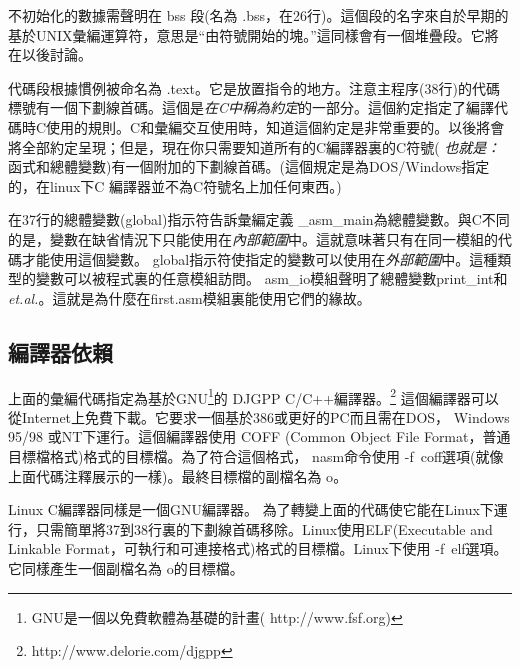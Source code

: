 不初始化的數據需聲明在 bss 段(名為{\code
.bss}，在26行)。這個段的名字來自於早期的基於UNIX彙編運算符，意思是``由符號開始的塊。''這同樣會有一個堆疊段。它將在以後討論。

代碼段根據慣例被命名為{\code
.text}。它是放置指令的地方。注意主程序(38行)的代碼標號有一個下劃線首碼。這個是\emph{在C中稱為約定}的一部分。這個約定指定了編譯代碼時C使用的規則。C和彙編交互使用時，知道這個約定是非常重要的。以後將會將全部約定呈現；但是，現在你只需要知道所有的C編譯器裏的C符號({\em
也就是：}
函式和總體變數)有一個附加的下劃線首碼。(這個規定是為DOS/Windows指定的，在linux下C
編譯器並不為C符號名上加任何東西。)

在37行的總體變數(global){}指示符告訴彙編定義{\code
\_asm\_main}為總體變數。與C不同的是，變數在缺省情況下只能使用在\emph{內部範圍}中。這就意味著只有在同一模組的代碼才能使用這個變數。
{\code
global}指示符使指定的變數可以使用在\emph{外部範圍}中。這種類型的變數可以被程式裏的任意模組訪問。{\code
asm\_io}模組聲明了總體變數{\code print\_int}和{\em
et.al.\/}。這就是為什麼在{\code first.asm}模組裏能使用它們的緣故。

\subsection{編譯器依賴}

上面的彙編代碼指定為基於GNU\footnote{GNU是一個以免費軟體為基礎的計畫({\code
http://www.fsf.org})}的 DJGPP 
C/C++編譯器。\footnote{\code http://www.delorie.com/djgpp}
這個編譯器可以從Internet上免費下載。它要求一個基於386或更好的PC而且需在DOS，
Windows 95/98 或NT下運行。這個編譯器使用 COFF (Common Object File
Format，普通目標檔格式)格式的目標檔。為了符合這個格式，{\code
nasm}命令使用{\code
-f~coff}選項(就像上面代碼注釋展示的一樣)。最終目標檔的副檔名為{\code
o}。

Linux C編譯器同樣是一個GNU編譯器。
為了轉變上面的代碼使它能在Linux下運行，只需簡單將37到38行裏的下劃線首碼移除。Linux使用ELF(Executable
and Linkable
Format，可執行和可連接格式)格式的目標檔。Linux下使用{\code
-f~elf}選項。它同樣產生一個副檔名為{\code
o}的目標檔。

